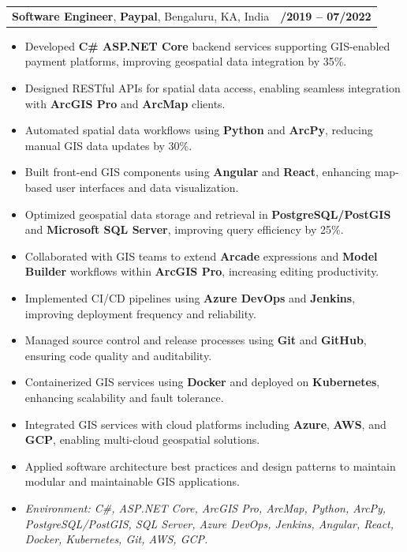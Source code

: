 \documentclass[letterpaper,11pt]{article}
\makeatletter
\newcommand{\resumeItem}[1]{
  \item\footnotesize{
    {#1 \vspace{-2pt}}
  }
}
\newcommand{\resumeSubheading}[4]{
  \vspace{-2pt}\item
    \begin{tabular*}{1.0\textwidth}[t]{l@{\extracolsep{\fill}}r}
      \textbf{\fontsize{10pt}{14pt}\selectfont #3}, \textbf{\fontsize{10pt}{14pt}\selectfont #1}, \fontsize{10pt}{14pt}\selectfont #4 & \textbf{\fontsize{10pt}{14pt}\selectfont #2} \\
    \end{tabular*}\vspace{-7pt}
}
\newcommand{\resumeItemListStart}{\begin{itemize}[leftmargin=*]}
\newcommand{\resumeItemListEnd}{\end{itemize}\vspace{-5pt}}
\makeatother
\begin{document}
\resumeSubheading
{Paypal}{08/2019 -- 07/2022}
{Software Engineer}{Bengaluru, KA, India}
\resumeItemListStart
  \resumeItem{Developed \textbf{C\# ASP.NET Core} backend services supporting GIS-enabled payment platforms, improving geospatial data integration by 35\%.}
  \resumeItem{Designed RESTful APIs for spatial data access, enabling seamless integration with \textbf{ArcGIS Pro} and \textbf{ArcMap} clients.}
  \resumeItem{Automated spatial data workflows using \textbf{Python} and \textbf{ArcPy}, reducing manual GIS data updates by 30\%.}
  \resumeItem{Built front-end GIS components using \textbf{Angular} and \textbf{React}, enhancing map-based user interfaces and data visualization.}
  \resumeItem{Optimized geospatial data storage and retrieval in \textbf{PostgreSQL/PostGIS} and \textbf{Microsoft SQL Server}, improving query efficiency by 25\%.}
  \resumeItem{Collaborated with GIS teams to extend \textbf{Arcade} expressions and \textbf{Model Builder} workflows within \textbf{ArcGIS Pro}, increasing editing productivity.}
  \resumeItem{Implemented CI/CD pipelines using \textbf{Azure DevOps} and \textbf{Jenkins}, improving deployment frequency and reliability.}
  \resumeItem{Managed source control and release processes using \textbf{Git} and \textbf{GitHub}, ensuring code quality and auditability.}
  \resumeItem{Containerized GIS services using \textbf{Docker} and deployed on \textbf{Kubernetes}, enhancing scalability and fault tolerance.}
  \resumeItem{Integrated GIS services with cloud platforms including \textbf{Azure}, \textbf{AWS}, and \textbf{GCP}, enabling multi-cloud geospatial solutions.}
  \resumeItem{Applied software architecture best practices and design patterns to maintain modular and maintainable GIS applications.}
  \resumeItem{\textit{Environment: C\#, ASP.NET Core, ArcGIS Pro, ArcMap, Python, ArcPy, PostgreSQL/PostGIS, SQL Server, Azure DevOps, Jenkins, Angular, React, Docker, Kubernetes, Git, AWS, GCP.}}
\resumeItemListEnd
\end{document}
